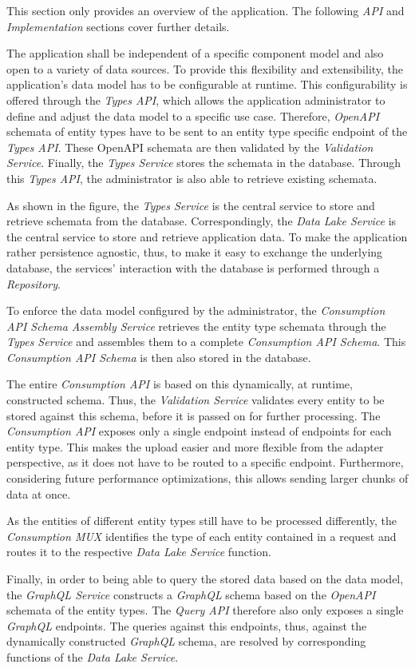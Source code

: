 This section only provides an overview of the application. The following \emph{API} and \emph{Implementation} sections cover further details.\par
The application shall be independent of a specific component model and also open to a variety of data sources. To provide this flexibility and extensibility, the application's data model has to be configurable at runtime. This configurability is offered through the \emph{Types API}, which allows the application administrator to define and adjust the data model to a specific use case. Therefore, \emph{OpenAPI} schemata of entity types have to be sent to an entity type specific endpoint of the \emph{Types API}. These OpenAPI schemata are then validated by the \emph{Validation Service}. Finally, the \emph{Types Service} stores the schemata in the database. Through this \emph{Types API}, the administrator is also able to retrieve existing schemata.\par
As shown in the figure, the \emph{Types Service} is the central service to store and retrieve schemata from the database. Correspondingly, the \emph{Data Lake Service} is the central service to store and retrieve application data. To make the application rather persistence agnostic, thus, to make it easy to exchange the underlying database, the services' interaction with the database is performed through a \emph{Repository}.\par 
To enforce the data model configured by the administrator, the \emph{Consumption API Schema Assembly Service} retrieves the entity type schemata through the \emph{Types Service} and assembles them to a complete \emph{Consumption API Schema}. This \emph{Consumption API Schema} is then also stored in the database.\par
The entire \emph{Consumption API} is based on this dynamically, at runtime, constructed schema. Thus, the \emph{Validation Service} validates every entity to be stored against this schema, before it is passed on for further processing. The \emph{Consumption API} exposes only a single endpoint instead of endpoints for each entity type. This makes the upload easier and more flexible from the adapter perspective, as it does not have to be routed to a specific endpoint. Furthermore, considering future performance optimizations, this allows sending larger chunks of data at once.\par
As the entities of different entity types still have to be processed differently, the \emph{Consumption MUX} identifies the type of each entity contained in a request and routes it to the respective \emph{Data Lake Service} function.\par 
Finally, in order to being able to query the stored data based on the data model, the \emph{GraphQL Service} constructs a \emph{GraphQL} schema based on the \emph{OpenAPI} schemata of the entity types. The \emph{Query API} therefore also only exposes a single \emph{GraphQL} endpoints. The queries against this endpoints, thus, against the dynamically constructed \emph{GraphQL} schema, are resolved by corresponding functions of the \emph{Data Lake Service}.\\

